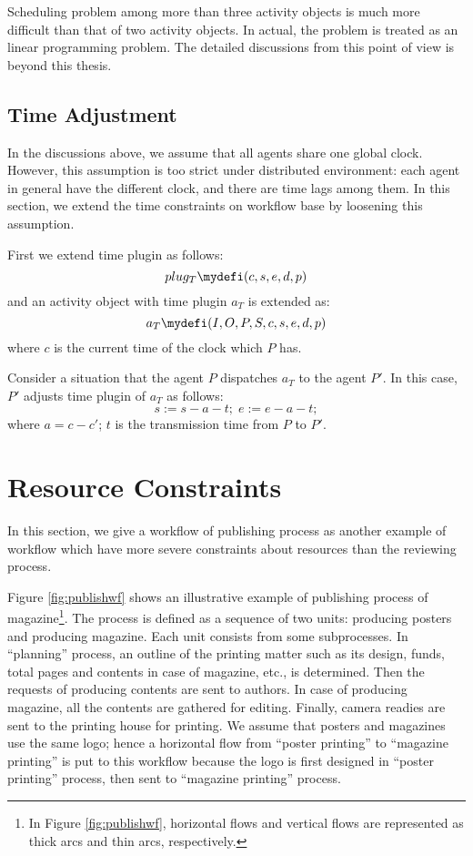 Scheduling problem among more than three activity objects is much more
difficult than that of two activity objects.  In actual, the problem is
treated as an linear programming problem.  The detailed discussions from
this point of view is beyond this thesis.  

\subsection{Time Adjustment}
\label{sec:timeadj}

In the discussions above, we assume that all agents share one global
clock.  However, this assumption is too strict under distributed
environment: each agent in general have the different clock, and there
are time lags among them.  In this section, we extend the time
constraints on workflow base by loosening this assumption.

First we extend time plugin as follows:
\[
 plug_T \mydefi (c, s, e, d, p)
\]
and an activity object with time plugin $a_T$ is extended as:
\[
 a_T \mydefi (I, O, P, S, c, s, e, d, p)
\]
where $c$ is the current time of the clock which $P$ has.

Consider a situation that the agent $P$ dispatches $a_T$ to the
agent $P'$.  In this case, $P'$ adjusts time plugin of $a_T$ as follows: 
\[
 s := s - a - t;\;  e := e - a - t;
\]
where $a = c - c'$; $t$ is the transmission time from $P$ to $P'$.

\section{Resource Constraints}
\label{sec:resourceConstraints}

In this section, we give a workflow of publishing process as another
example of workflow which have more severe constraints about resources
than the reviewing process.

Figure \ref{fig:publishwf} shows an illustrative example of publishing
process of magazine\footnote{In Figure \ref{fig:publishwf}, horizontal
flows and vertical flows are represented as thick arcs and thin arcs,
respectively.}.  The process is defined as a sequence of two units:
producing posters and producing magazine.  Each unit consists from some
subprocesses.  In ``planning'' process, an outline of the printing
matter such as its design, funds, total pages and contents in case of
magazine, etc., is determined.  Then the requests of producing contents
are sent to authors.  In case of producing magazine, all the contents
are gathered for editing.  Finally, camera readies are sent to the
printing house for printing.  We assume that posters and magazines use
the same logo; hence a horizontal flow from ``poster printing'' to
``magazine printing'' is put to this workflow because the logo is first
designed in ``poster printing'' process, then sent to ``magazine
printing'' process.

